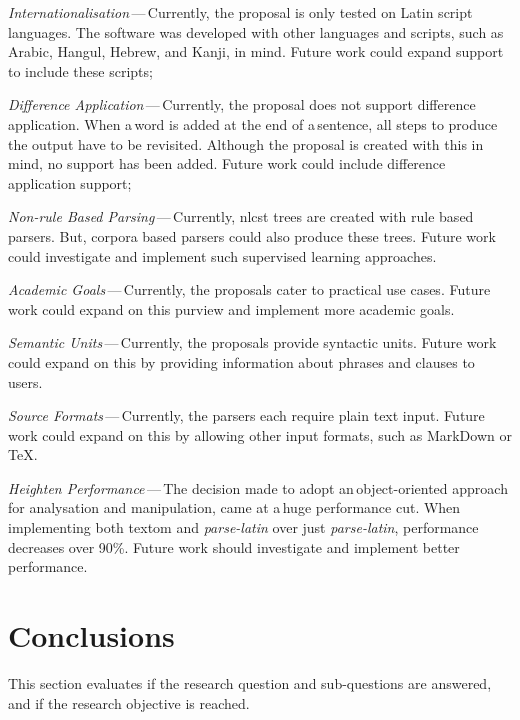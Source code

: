 \begin{aenumerate}
\item\emph{Internationalisation}\,---\,Currently, the proposal is only
    tested on Latin script languages.
  The software was developed with other languages and scripts, such as
    Arabic, Hangul, Hebrew, and Kanji, in mind.
  Future work could expand support to include these scripts;
\item\emph{Difference Application}\,---\,Currently, the proposal does not
    support difference application.
  When a\,word is added at the end of a\,sentence, all steps to produce the
    output have to be revisited.
  Although the proposal is created with this in mind, no support has been
    added.
  Future work could include difference application support;
\item\emph{Non-rule Based Parsing}\,---\,Currently, \gls{nlcst} trees are
    created with rule based parsers.
  But, corpora based parsers could also produce these trees.
  Future work could investigate and implement such supervised learning
    approaches.
\item\emph{Academic Goals}\,---\,Currently, the proposals cater to practical use
    cases.
  Future work could expand on this purview and implement more academic
    goals.
\item\emph{Semantic Units}\,---\,Currently, the proposals provide syntactic
    units.
  Future work could expand on this by providing information about phrases
    and clauses to users.
\item\emph{Source Formats}\,---\,Currently, the parsers each require plain
    text input.
  Future work could expand on this by allowing other input formats, such as
    MarkDown or \TeX.
\item\emph{Heighten Performance}\,---\,The decision made to adopt
    an\,object-oriented approach for analysation and manipulation, came at
    a\,huge performance cut.
  When implementing both \gls{textom} and \emph{parse-latin} over just
    \emph{parse-latin}, performance decreases over 90\%.
  Future work should investigate and implement better performance.
\end{aenumerate}

\section{Conclusions}\label{conclusions}

This section evaluates if the research question and sub-questions are
  answered, and if the research objective is reached.

